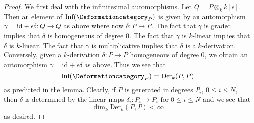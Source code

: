\begin{proof}
We first deal with the infinitesimal automorphisms.
Let $Q = P \otimes_k k[\epsilon]$.
Then an element of $\text{Inf}(\Deformationcategory_P)$
is given by an automorphism
$\gamma = \text{id} + \epsilon \delta : Q \to Q$
as above where now $\delta : P \to P$.
The fact that $\gamma$ is graded implies that
$\delta$ is homogeneous of degree $0$.
The fact that $\gamma$ is $k$-linear implies that
$\delta$ is $k$-linear.
The fact that $\gamma$ is multiplicative implies that
$\delta$ is a $k$-derivation.
Conversely, given a $k$-derivation $\delta : P \to P$
homogeneous of degree $0$, we obtain an automorphism
$\gamma = \text{id} + \epsilon \delta$ as above.
Thus we see that
$$
\text{Inf}(\Deformationcategory_P) = \text{Der}_k(P, P)
$$
as predicted in the lemma.
Clearly, if $P$ is generated in degrees $P_i$,
$0 \leq i \leq N$, then $\delta$ is determined by
the linear maps $\delta_i : P_i \to P_i$ for
$0 \leq i \leq N$ and we see that
$$
\dim_k \text{Der}_k(P, P) < \infty
$$
as desired.


\end{proof}
